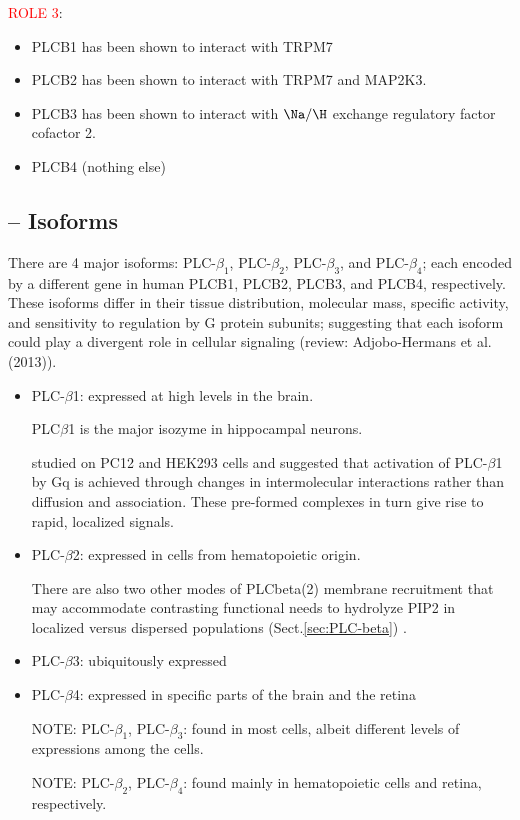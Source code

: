 \textcolor{red}{ROLE 3}: 
\begin{itemize}
  \item PLCB1 has been shown to interact with TRPM7
  \item PLCB2 has been shown to interact with TRPM7 and MAP2K3.
  \item PLCB3 has been shown to interact with $\Na/\H$ exchange regulatory
  factor cofactor 2.
  \item PLCB4 (nothing else)
\end{itemize}


\subsection{-- Isoforms}

There are 4 major isoforms: PLC-$\beta_1$, PLC-$\beta_2$, PLC-$\beta_3$, and
PLC-$\beta_4$; each encoded by a different gene in human PLCB1, PLCB2, PLCB3,
and PLCB4, respectively. These isoforms differ in their tissue distribution,
molecular mass, specific activity, and sensitivity to regulation by G protein
subunits; suggesting that each isoform could play a divergent role in cellular
signaling (review: Adjobo-Hermans et al. (2013)).

\begin{itemize}
  \item PLC-$\beta$1: expressed at high levels in the brain.

PLC$\beta$1 is the major isozyme in hippocampal neurons.
  
\citep{dowal2008} studied on  PC12 and HEK293 cells and suggested that
activation of PLC-$\beta$1 by Gq is achieved through changes in intermolecular
interactions rather than diffusion and association. These pre-formed complexes
in turn give rise to rapid, localized signals.
  
  \item PLC-$\beta$2: expressed in cells from hematopoietic origin.
  
There are also two other modes of PLCbeta(2) membrane recruitment that
may accommodate contrasting functional needs to hydrolyze PIP2 in localized
versus dispersed populations (Sect.\ref{sec:PLC-beta}) \citep{gutman2010}.

  \item PLC-$\beta$3: ubiquitously expressed
  
  \item PLC-$\beta$4: expressed in specific parts of the brain and the retina
  
NOTE: PLC-$\beta_1$, PLC-$\beta_3$: found in most cells, albeit different
levels of expressions among the cells.
  
NOTE: PLC-$\beta_2$, PLC-$\beta_4$: found mainly in hematopoietic cells
and retina, respectively.

\end{itemize}

